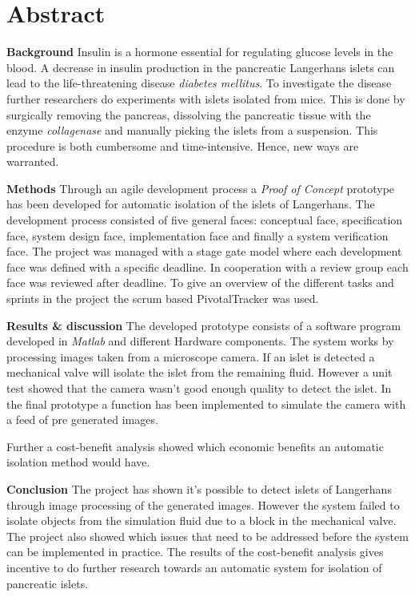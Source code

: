 \section*{Abstract}
\textbf{Background}
Insulin is a hormone essential for regulating glucose levels in the blood. A decrease in insulin production in the pancreatic Langerhans islets can lead to the life-threatening disease \textit{diabetes mellitus}. To investigate the disease further researchers do experiments with islets isolated from mice. This is done by surgically removing the pancreas, dissolving the pancreatic tissue with the enzyme \textit{collagenase} and manually picking the islets from a suspension. This procedure is both cumbersome and time-intensive. Hence, new ways are warranted.   

\textbf{Methods}
Through an agile development process a \textit{Proof of Concept} prototype has been developed for automatic isolation of the islets of Langerhans. The development process consisted of five general faces: conceptual face,  specification face, system design face, implementation face and finally a system verification face. The project was managed with a stage gate model where each development face was defined with a specific deadline. In cooperation with a review group each face was reviewed after deadline. To give an overview of the different tasks and sprints in the project the scrum based PivotalTracker was used.   


\textbf{Results \& discussion} The developed prototype consists of a software program developed in \textit{Matlab} and different Hardware components.  The system works by processing images taken from a microscope camera. If an islet is detected a mechanical valve will isolate the islet from the remaining fluid. However a unit test showed that the camera wasn't good enough quality to detect the islet. In the final prototype a function has been implemented to simulate the camera with a feed of pre generated images.

Further a cost-benefit analysis showed which economic benefits an automatic isolation method would have. 

\textbf{Conclusion}
The project has shown it's possible to detect islets of Langerhans through image processing of the generated images. However the system failed to isolate objects from the simulation fluid due to a block in the mechanical valve. The project also showed which issues that need to be addressed before the system can be implemented in practice. The results of the cost-benefit analysis gives incentive to do further research towards an automatic system for isolation of pancreatic islets. 